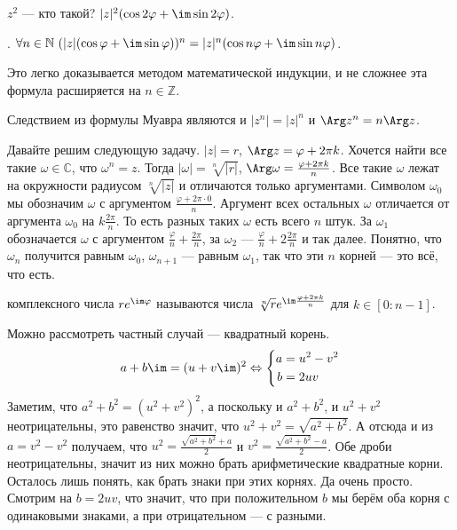 \documentclass{article}
\begin{document}
\begin{itemize}
\begin{Comment}
            $z^2$ --- кто такой? $|z|^2(\cos2\varphi+\im\sin2\varphi)$.
        \end{Comment}
        \thm {}. $\forall n\in\mathbb N~(|z|(\cos\varphi+\im\sin\varphi))^n=|z|^n(\cos n\varphi+\im\sin n\varphi)$.
        \begin{Proof}
            Это легко доказывается методом математической индукции, и не сложнее эта формула расширяется на $n\in\mathbb Z$.
        \end{Proof}
        \thm Следствием из формулы Муавра являются и $|z^n|=|z|^n$ и $\Arg z^n=n\Arg z$.
        \begin{Comment}
            Давайте решим следующую задачу. $|z|=r$, $\Arg z=\varphi+2\pi k$. Хочется найти все такие $\omega\in\mathbb C$, что $\omega^n=z$. Тогда $|\omega|=\sqrt[n]{|r|}$, $\Arg\omega=\frac{\varphi+2\pi k}n$. Все такие $\omega$ лежат на окружности радиусом $\sqrt[n]{|z|}$ и отличаются только аргументами. Символом $\omega_0$ мы обозначим $\omega$ с аргументом $\frac{\varphi+2\pi\cdot0}n$. Аргумент всех остальных $\omega$ отличается от аргумента $\omega_0$ на $k\frac{2\pi}n$. То есть разных таких $\omega$ есть всего $n$ штук. За $\omega_1$ обозначается $\omega$ с аргументом $\frac\varphi n+\frac{2\pi}n$, за $\omega_2$ --- $\frac\varphi n+2\frac{2\pi}n$ и так далее. Понятно, что $\omega_n$ получится равным $\omega_0$, $\omega_{n+1}$ --- равным $\omega_1$, так что эти $n$ корней --- это всё, что есть.
        \end{Comment}
        \dfn {} комплексного числа $re^{\im\varphi}$ называются числа $\sqrt[n]re^{\im\frac{\varphi+2\pi k}n}$ для $k\in[0:n-1]$.
        \begin{Comment}
            Можно рассмотреть частный случай --- квадратный корень.
            \[
            a+b\im=(u+v\im)^2\Leftrightarrow
            \left\{\begin{aligned}
                a&=u^2-v^2\\
                b&=2uv
            \end{aligned}\right.
            \]
            Заметим, что $a^2+b^2=(u^2+v^2)^2$, а поскольку и $a^2+b^2$, и $u^2+v^2$ неотрицательны, это равенство значит, что $u^2+v^2=\sqrt{a^2+b^2}$. А отсюда и из $a=v^2-v^2$ получаем, что $u^2=\frac{\sqrt{a^2+b^2}+a}2$ и $v^2=\frac{\sqrt{a^2+b^2}-a}2$. Обе дроби неотрицательны, значит из них можно брать арифметические квадратные корни. Осталось лишь понять, как брать знаки при этих корнях. Да очень просто. Смотрим на $b=2uv$, что значит, что при положительном $b$ мы берём оба корня с одинаковыми знаками, а при отрицательном --- с разными.

\end{Comment}
\end{itemize}
\end{document}
